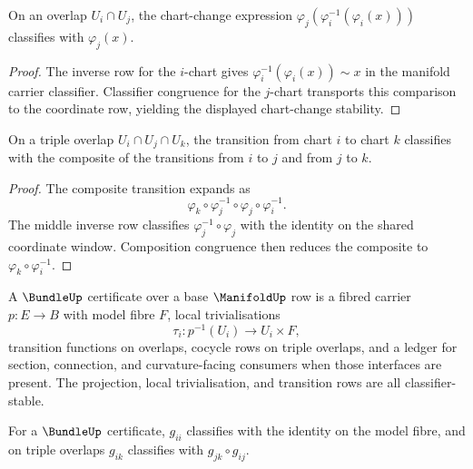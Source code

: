 \begin{theorem}
\label{thm:geometry-spine-chart-change-stability}
On an overlap $U_i\cap U_j$, the chart-change expression
$\varphi_j(\varphi_i^{-1}(\varphi_i(x)))$ classifies with $\varphi_j(x)$.
\end{theorem}

\begin{proof}
The inverse row for the $i$-chart gives
$\varphi_i^{-1}(\varphi_i(x))\sim x$ in the manifold carrier classifier.
Classifier congruence for the $j$-chart transports this comparison to the
coordinate row, yielding the displayed chart-change stability.
\end{proof}

\begin{theorem}
\label{thm:geometry-spine-manifold-transition-cocycle}
On a triple overlap $U_i\cap U_j\cap U_k$, the transition from chart $i$ to
chart $k$ classifies with the composite of the transitions from $i$ to $j$
and from $j$ to $k$.
\end{theorem}

\begin{proof}
The composite transition expands as
$$
\varphi_k\circ\varphi_j^{-1}\circ\varphi_j\circ\varphi_i^{-1}.
$$
The middle inverse row classifies
$\varphi_j^{-1}\circ\varphi_j$ with the identity on the shared coordinate
window.  Composition congruence then reduces the composite to
$\varphi_k\circ\varphi_i^{-1}$.
\end{proof}

\begin{definition}
\label{def:geometry-spine-bundle}
A $\BundleUp$ certificate over a base $\ManifoldUp$ row is a fibred carrier
$p:E\to B$ with model fibre $F$, local trivialisations
$$
\tau_i:p^{-1}(U_i)\to U_i\times F,
$$
transition functions on overlaps, cocycle rows on triple overlaps, and a
ledger for section, connection, and curvature-facing consumers when those
interfaces are present.  The projection, local trivialisation, and transition
rows are all classifier-stable.
\end{definition}

\begin{theorem}
\label{thm:geometry-spine-bundle-cocycle}
For a $\BundleUp$ certificate, $g_{ii}$ classifies with the identity on the
model fibre, and on triple overlaps $g_{ik}$ classifies with
$g_{jk}\circ g_{ij}$.
\end{theorem}

